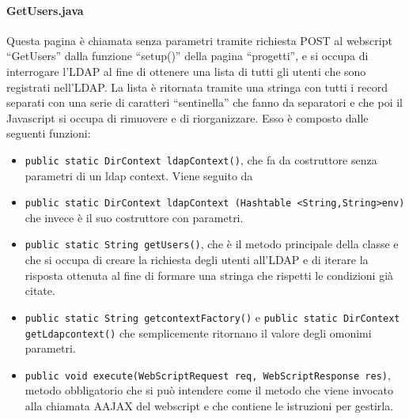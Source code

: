 \paragraph{GetUsers.java}
Questa pagina è chiamata senza parametri tramite richiesta POST al webscript “GetUsers” dalla funzione “setup()” della pagina “progetti”, e si occupa di interrogare l’LDAP al fine di ottenere una lista di tutti gli utenti che sono registrati nell’LDAP. La lista è ritornata tramite una stringa con tutti i record separati con una serie di caratteri “sentinella” che fanno da separatori e che poi il Javascript si occupa di rimuovere e di riorganizzare. Esso è composto dalle seguenti funzioni:
\begin{itemize}
\item \texttt{public static DirContext ldapContext()}, che fa da costruttore senza parametri di un ldap context. Viene seguito da
\item \texttt{public static DirContext ldapContext (Hashtable <String,String>env)} che invece è il suo costruttore con parametri.
\item \texttt{public static String getUsers()}, che è il metodo principale della classe e che si occupa di creare la richiesta degli utenti all’LDAP e di iterare la risposta ottenuta al fine di formare una stringa che rispetti le condizioni già citate.
\item \texttt{public static String getcontextFactory()} e \texttt{public static DirContext getLdapcontext()} che  semplicemente ritornano il valore degli omonimi  parametri.
\item \texttt{public void execute(WebScriptRequest req, WebScriptResponse res)}, metodo obbligatorio che si può intendere come il metodo che viene invocato alla chiamata AAJAX del webscript e che contiene le istruzioni per gestirla.
\end{itemize}
